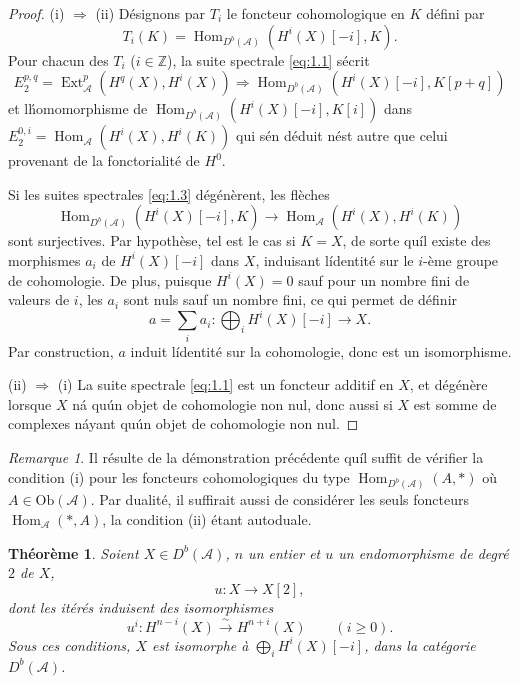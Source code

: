 \documentclass[12pt]{amsart}
\theoremstyle{plain}
\newtheorem{thm}[prop]{Th\'eor\`eme}
\theoremstyle{remark}
\newtheorem{rem}[prop]{Remarque}
\DeclareMathOperator{\Hom}{Hom}
\DeclareMathOperator{\Ext}{Ext}
\newcommand{\cA}{\mathscr{A}}
\newcommand{\Ob}{\text{Ob}}
\newcommand{\db}{D^b}
\begin{document}
\begin{proof}
(i) $\Rightarrow$ (ii) D\'esignons par $T_i$ le foncteur cohomologique en $K$ d\'efini par
\[
T_i(K) = \Hom_{\db(\cA)}(H^i(X)[-i], K).
\]
Pour chacun des $T_i$ ($i \in \mathbb{Z}$), la suite spectrale \eqref{eq:1.1} s\'ecrit
\begin{equation}\label{eq:1.3}
E_2^{p,q} = \Ext_{\cA}^p(H^q(X), H^i(X)) \Rightarrow \Hom_{\db(\cA)}(H^i(X)[-i], K[p+q])
\end{equation}
et l\'homomorphisme de $\Hom_{\db(\cA)}(H^i(X)[-i], K[i])$ dans $E_2^{0,i} = \Hom_{\cA}(H^i(X), H^i(K))$ qui s\'en d\'eduit n\'est autre que celui provenant de la fonctorialit\'e de $H^0$.

Si les suites spectrales \eqref{eq:1.3} d\'eg\'en\`erent, les fl\`eches
\[
\Hom_{\db(\cA)}(H^i(X)[-i], K) \longrightarrow \Hom_{\cA}(H^i(X), H^i(K))
\]
sont surjectives. Par hypoth\`ese, tel est le cas si $K = X$, de sorte qu\'il existe des morphismes $a_i$ de $H^i(X)[-i]$ dans $X$, induisant l\'identit\'e sur le $i$-\`eme groupe de cohomologie. De plus, puisque $H^i(X) = 0$ sauf pour un nombre fini de valeurs de $i$, les $a_i$ sont nuls sauf un nombre fini, ce qui permet de d\'efinir
\[
a = \sum_i a_i : \bigoplus_i H^i(X)[-i] \longrightarrow X.
\]
Par construction, $a$ induit l\'identit\'e sur la cohomologie, donc est un isomorphisme.

(ii) $\Rightarrow$ (i) La suite spectrale \eqref{eq:1.1} est un foncteur additif en $X$, et d\'eg\'en\`ere lorsque $X$ n\'a qu\'un objet de cohomologie non nul, donc aussi si $X$ est somme de complexes n\'ayant qu\'un objet de cohomologie non nul.
\end{proof}

\begin{rem}\label{rem:1.4}
Il r\'esulte de la d\'emonstration pr\'ec\'edente qu\'il suffit de v\'erifier la condition (i) pour les foncteurs cohomologiques du type $\Hom_{\db(\cA)}(A, *)$ o\`u $A \in \Ob(\cA)$. Par dualit\'e, il suffirait aussi de consid\'erer les seuls foncteurs $\Hom_{\cA}(*, A)$, la condition (ii) \'etant autoduale.
\end{rem}

\begin{thm}\label{thm:1.5}
Soient $X \in \db(\cA)$, $n$ un entier et $u$ un endomorphisme de degr\'e $2$ de $X$,
\[
u : X \longrightarrow X[2],
\]
dont les it\'er\'es induisent des isomorphismes
\[
u^i : H^{n-i}(X) \xrightarrow{\sim} H^{n+i}(X) \qquad (i \geq 0).
\]
Sous ces conditions, $X$ est isomorphe \`a $\bigoplus_i H^i(X)[-i]$, dans la cat\'egorie $\db(\cA)$.
\end{thm}
\end{document}
